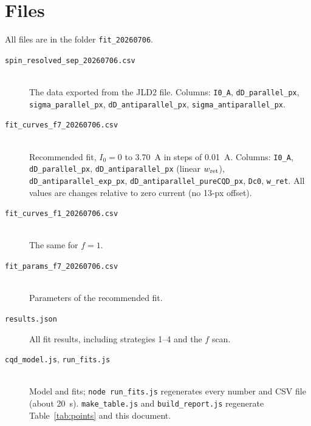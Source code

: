 \documentclass[11pt,a4paper]{article}
\begin{document}
\section{Files}
All files are in the folder \texttt{fit\_20260706}.
\begin{description}
\item[\texttt{spin\_resolved\_sep\_20260706.csv}] \mbox{}\\ The data exported from the JLD2 file.
Columns: \texttt{I0\_A}, \texttt{dD\_parallel\_px},\\ \texttt{sigma\_parallel\_px},
\texttt{dD\_antiparallel\_px}, \texttt{sigma\_antiparallel\_px}.
\item[\texttt{fit\_curves\_f7\_20260706.csv}] \mbox{}\\ Recommended fit, $I_0=0$ to 3.70~A in steps of 0.01~A.
Columns: \texttt{I0\_A}, \texttt{dD\_parallel\_px}, \texttt{dD\_antiparallel\_px} (linear $w_{\rm ret}$),\\
\texttt{dD\_antiparallel\_exp\_px}, \texttt{dD\_antiparallel\_pureCQD\_px}, \texttt{Dc0}, \texttt{w\_ret}.
All values are changes relative to zero current (no 13-px offset).
\item[\texttt{fit\_curves\_f1\_20260706.csv}] \mbox{}\\ The same for $f=1$.
\item[\texttt{fit\_params\_f7\_20260706.csv}] \mbox{}\\ Parameters of the recommended fit.
\item[\texttt{results.json}] All fit results, including strategies 1--4 and the $f$ scan.
\item[\texttt{cqd\_model.js}, \texttt{run\_fits.js}] \mbox{}\\ Model and fits; \texttt{node run\_fits.js}
regenerates every number and CSV file (about 20~s). \texttt{make\_table.js} and
\texttt{build\_report.js} regenerate Table~\ref{tab:points} and this document.
\end{description}
\end{document}
